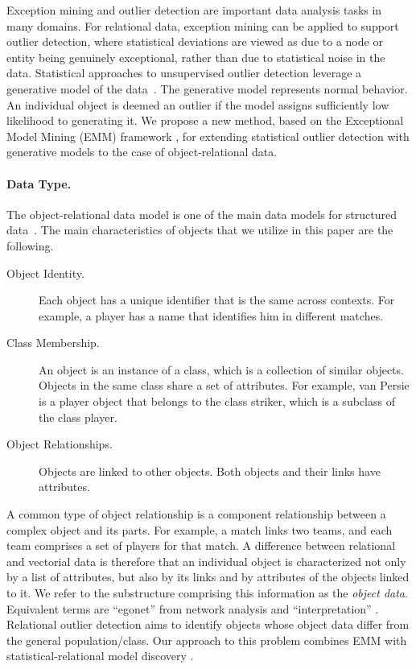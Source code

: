 {Exception mining and outlier detection are important data analysis tasks in many domains. For relational data, exception mining can be applied to support outlier detection, where statistical deviations are viewed as due to a node or entity being genuinely exceptional, rather than due to statistical noise in the data. Statistical approaches to unsupervised outlier detection leverage a generative model of the data~\citep{aggarwal2013}. The generative model represents normal behavior. An individual object is deemed an outlier if  the model assigns sufficiently low likelihood to generating it. 
We propose a new method, based on the Exceptional Model Mining (EMM) framework \citep{Duivesteijn2016}, for extending statistical  outlier detection with generative models to the case of object-relational data. 



\paragraph{Data Type.} The object-relational data model is one of the main data models for structured data~\citep{Koller1997}. The main 
characteristics of objects that we utilize in this paper are the following. 

\begin{description}
\item[Object Identity.] Each object has a unique identifier that is the same across contexts. For example, a player has a name that identifies him in different matches. 
\item[Class Membership.] An object is an instance of a class, which is a collection of similar objects. Objects in the same class share a set of attributes. For example, van Persie is a player object that belongs to the class striker, which is a subclass of the  class player.
\item[Object Relationships.] Objects are linked  to other objects. Both objects and their links have attributes. 
\end{description}


A common type of object relationship is a component relationship between a complex object and its parts.
For example, a match links two teams, and each team comprises a set of players for that match. A difference between relational and vectorial data is therefore that an individual object is characterized not only by a list of attributes, but also by its links and by attributes of the objects linked to it. We refer to the substructure comprising this information as the {\em object data}. Equivalent terms are ``egonet'' from network analysis \citep{Akoglu2015} and ``interpretation'' \citep{Maervoet2012}. Relational outlier detection aims to identify objects whose object data differ from the general population/class. Our approach to this problem combines EMM with statistical-relational model discovery \citep{SRL2007}.

}
